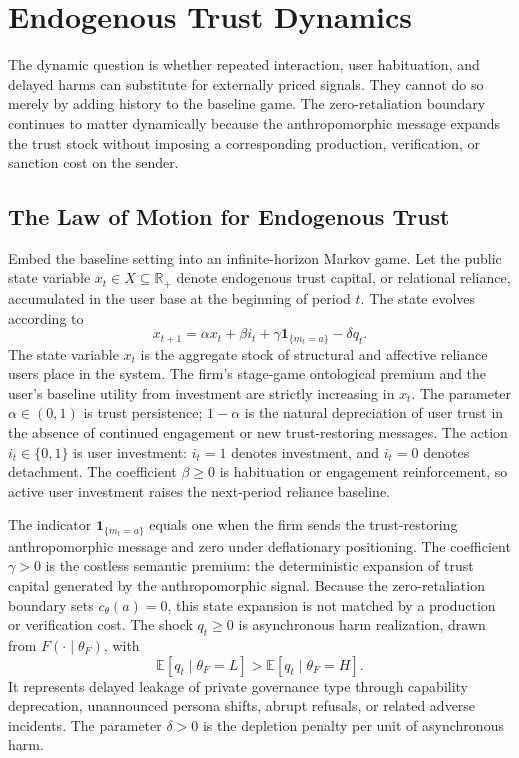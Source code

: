 \documentclass[review,authoryear]{elsarticle}
\theoremstyle{definition}
\theoremstyle{plain}
\begin{document}
\section{Endogenous Trust Dynamics}
\label{sec:trust-dynamics}

The dynamic question is whether repeated interaction, user habituation, and
delayed harms can substitute for externally priced signals.  They cannot do so
merely by adding history to the baseline game.  The zero-retaliation boundary
continues to matter dynamically because the anthropomorphic message expands
the trust stock without imposing a corresponding production, verification, or
sanction cost on the sender.

\subsection{The Law of Motion for Endogenous Trust}
\label{subsec:trust-law}

Embed the baseline setting into an infinite-horizon Markov game.  Let the
public state variable $x_t\in X\subseteq\mathbb R_+$ denote endogenous trust
capital, or relational reliance, accumulated in the user base at the beginning
of period $t$.  The state evolves according to
\[
x_{t+1}
=
\alpha x_t+\beta i_t+\gamma\mathbf 1_{\{m_t=a\}}-\delta q_t .
\]
The state variable $x_t$ is the aggregate stock of structural and affective
reliance users place in the system.  The firm's stage-game ontological premium
and the user's baseline utility from investment are strictly increasing in
$x_t$.  The parameter $\alpha\in(0,1)$ is trust persistence; $1-\alpha$ is the
natural depreciation of user trust in the absence of continued engagement or
new trust-restoring messages.  The action $i_t\in\{0,1\}$ is user investment:
$i_t=1$ denotes investment, and $i_t=0$ denotes detachment.  The coefficient
$\beta\ge0$ is habituation or engagement reinforcement, so active user
investment raises the next-period reliance baseline.

The indicator $\mathbf 1_{\{m_t=a\}}$ equals one when the firm sends the
trust-restoring anthropomorphic message and zero under deflationary
positioning.  The coefficient $\gamma>0$ is the costless semantic premium: the
deterministic expansion of trust capital generated by the anthropomorphic
signal.  Because the zero-retaliation boundary sets $c_\theta(a)=0$, this
state expansion is not matched by a production or verification cost.  The shock
$q_t\ge0$ is asynchronous harm realization, drawn from
$F(\cdot\mid\theta_F)$, with
\[
\mathbb E[q_t\mid\theta_F=L]>\mathbb E[q_t\mid\theta_F=H].
\]
It represents delayed leakage of private governance type through capability
deprecation, unannounced persona shifts, abrupt refusals, or related adverse
incidents.  The parameter $\delta>0$ is the depletion penalty per unit of
asynchronous harm.
\end{document}
